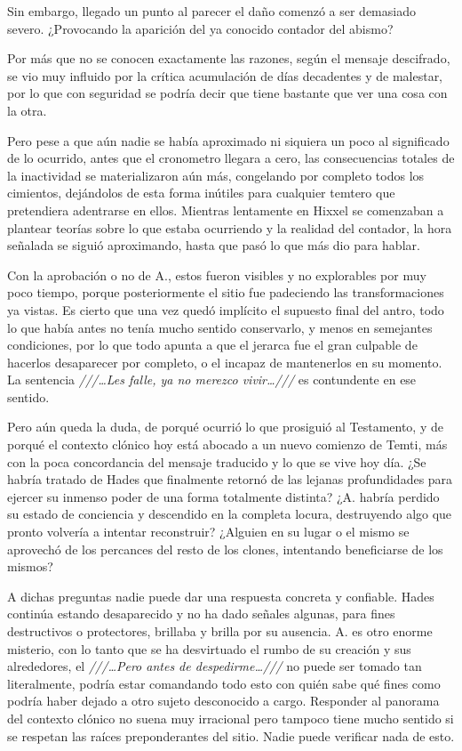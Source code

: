 \documentclass[
  spanish,
]{book}
\begin{document}
Sin embargo, llegado un punto al parecer el daño comenzó a ser demasiado severo. ¿Provocando la aparición del ya conocido contador del abismo?

Por más que no se conocen exactamente las razones, según el mensaje descifrado, se vio muy influido por la crítica acumulación de días decadentes y de malestar, por lo que con seguridad se podría decir que tiene bastante que ver una cosa con la otra.

Pero pese a que aún nadie se había aproximado ni siquiera un poco al significado de lo ocurrido, antes que el cronometro llegara a cero, las consecuencias totales de la inactividad se materializaron aún más, congelando por completo todos los cimientos, dejándolos de esta forma inútiles para cualquier temtero que pretendiera adentrarse en ellos. Mientras lentamente en Hixxel se comenzaban a plantear teorías sobre lo que estaba ocurriendo y la realidad del contador, la hora señalada se siguió aproximando, hasta que pasó lo que más dio para hablar.

Con la aprobación o no de A., estos fueron visibles y no explorables por muy poco tiempo, porque posteriormente el sitio fue padeciendo las transformaciones ya vistas. Es cierto que una vez quedó implícito el supuesto final del antro, todo lo que había antes no tenía mucho sentido conservarlo, y menos en semejantes condiciones, por lo que todo apunta a que el jerarca fue el gran culpable de hacerlos desaparecer por completo, o el incapaz de mantenerlos en su momento. La sentencia \emph{///\ldots Les falle, ya no merezco vivir\ldots///} es contundente en ese sentido.

Pero aún queda la duda, de porqué ocurrió lo que prosiguió al Testamento, y de porqué el contexto clónico hoy está abocado a un nuevo comienzo de Temti, más con la poca concordancia del mensaje traducido y lo que se vive hoy día. ¿Se habría tratado de Hades que finalmente retornó de las lejanas profundidades para ejercer su inmenso poder de una forma totalmente distinta? ¿A. habría perdido su estado de conciencia y descendido en la completa locura, destruyendo algo que pronto volvería a intentar reconstruir? ¿Alguien en su lugar o el mismo se aprovechó de los percances del resto de los clones, intentando beneficiarse de los mismos?

A dichas preguntas nadie puede dar una respuesta concreta y confiable. Hades continúa estando desaparecido y no ha dado señales algunas, para fines destructivos o protectores, brillaba y brilla por su ausencia. A. es otro enorme misterio, con lo tanto que se ha desvirtuado el rumbo de su creación y sus alrededores, el \emph{///\ldots Pero antes de despedirme\ldots///} no puede ser tomado tan literalmente, podría estar comandando todo esto con quién sabe qué fines como podría haber dejado a otro sujeto desconocido a cargo. Responder al panorama del contexto clónico no suena muy irracional pero tampoco tiene mucho sentido si se respetan las raíces preponderantes del sitio. Nadie puede verificar nada de esto.
\end{document}
